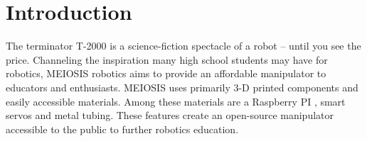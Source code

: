 \documentclass[12pt]{report}
\begin{document}
\normalem

{\tableofcontents\let\clearpage\relax\listoffigures\let\clearpage\relax\listoftables}
\clearpage
\newpage



\onehalfspacing
\section{Introduction}
\vspace{-.75\baselineskip}
The terminator T-2000 is a science-fiction spectacle of a robot -- until you see the price. Channeling the inspiration many high school students may have for robotics, MEIOSIS robotics aims to provide an affordable manipulator to educators and enthusiasts. MEIOSIS uses primarily 3-D printed components and easily accessible materials. Among these materials are a Raspberry PI , smart servos and metal tubing. These features create an open-source manipulator accessible to the public to further robotics education.
\end{document}
